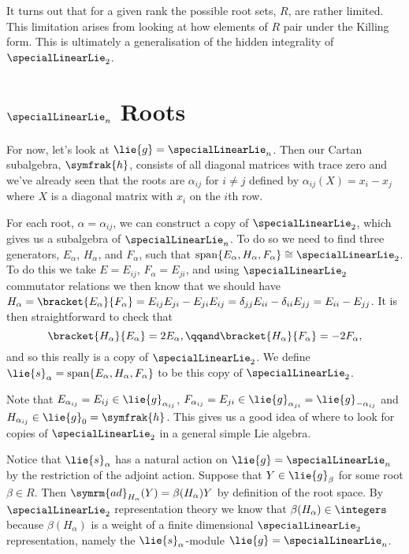 \documentclass[fleqn]{NotesClass}
\newcommand{\isomorphic}{\cong}
\DeclareMathOperator{\Span}{span}
\newcommand{\ad}{\symrm{ad}}
\newcommand{\csa}{\symfrak{h}}
\begin{document}
    It turns out that for a given rank the possible root sets, \(R\), are rather limited.
    This limitation arises from looking at how elements of \(R\) pair under the Killing form.
    This is ultimately a generalisation of the hidden integrality of \(\specialLinearLie_2\).
    
    \section{\texorpdfstring{\(\specialLinearLie_n\)}{sln} Roots}
    For now, let's look at \(\lie{g} = \specialLinearLie_n\).
    Then our Cartan subalgebra, \(\csa\), consists of all diagonal matrices with trace zero and we've already seen that the roots are \(\alpha_{ij}\) for \(i \ne j\) defined by \(\alpha_{ij}(X) = x_i - x_j\) where \(X\) is a diagonal matrix with \(x_i\) on the \(i\)th row.
    
    For each root, \(\alpha = \alpha_{ij}\), we can construct a copy of \(\specialLinearLie_2\), which gives us a subalgebra of \(\specialLinearLie_n\).
    To do so we need to find three generators, \(E_\alpha\), \(H_\alpha\), and \(F_\alpha\), such that \(\Span\{E_\alpha, H_\alpha, F_\alpha\} \isomorphic \specialLinearLie_2\).
    To do this we take \(E = E_{ij}\), \(F_\alpha = E_{ji}\), and using \(\specialLinearLie_2\) commutator relations we then know that we should have \(H_\alpha = \bracket{E_\alpha}{F_\alpha} = E_{ij}E_{ji} - E_{ji}E_{ij} = \delta_{jj}E_{ii} - \delta_{ii}E_{jj} = E_{ii} - E_{jj}\).
    It is then straightforward to check that
    \begin{equation}
        \bracket{H_\alpha}{E_\alpha} = 2E_\alpha, \qqand \bracket{H_\alpha}{F_\alpha} = -2F_\alpha,
    \end{equation}
    and so this really is a copy of \(\specialLinearLie_2\).
    We define \(\lie{s}_\alpha = \Span\{E_\alpha, H_\alpha, F_\alpha\}\) to be this copy of \(\specialLinearLie_2\).
    
    Note that \(E_{\alpha_{ij}} = E_{ij} \in \lie{g}_{\alpha_{ij}}\), \(F_{\alpha_{ij}} = E_{ji} \in \lie{g}_{\alpha_{ji}} = \lie{g}_{-\alpha_{ij}}\) and \(H_{\alpha_{ij}} \in \lie{g}_0 = \csa\).
    This gives us a good idea of where to look for copies of \(\specialLinearLie_2\) in a general simple Lie algebra.
    
    Notice that \(\lie{s}_\alpha\) has a natural action on \(\lie{g} = \specialLinearLie_n\) by the restriction of the adjoint action.
    Suppose that \(Y \in \lie{g}_\beta\) for some root \(\beta \in R\).
    Then \(\ad_{H_\alpha}(Y) = \beta(H_\alpha)Y\) by definition of the root space.
    By \(\specialLinearLie_2\) representation theory we know that \(\beta(H_\alpha) \in \integers\) because \(\beta(H_\alpha)\) is a weight of a finite dimensional \(\specialLinearLie_2\) representation, namely the \(\lie{s}_\alpha\)-module \(\lie{g} = \specialLinearLie_n\).
    
\end{document}
